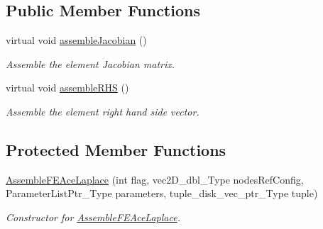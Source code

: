 \subsection*{Public Member Functions}
\begin{DoxyCompactItemize}
\item 
virtual void \hyperlink{classFEDD_1_1AssembleFEAceLaplace_ac47ac062ba522289f4e9a5dd2df78503}{assemble\+Jacobian} ()
\begin{DoxyCompactList}\small\item\em Assemble the element Jacobian matrix. \end{DoxyCompactList}\item 
virtual void \hyperlink{classFEDD_1_1AssembleFEAceLaplace_a6d2759738ff7b596b4f132bf234c772a}{assemble\+R\+HS} ()
\begin{DoxyCompactList}\small\item\em Assemble the element right hand side vector. \end{DoxyCompactList}\end{DoxyCompactItemize}
\subsection*{Protected Member Functions}
\begin{DoxyCompactItemize}
\item 
\hyperlink{classFEDD_1_1AssembleFEAceLaplace_a494e6229c1b403423c65810b0719e49e}{Assemble\+F\+E\+Ace\+Laplace} (int flag, vec2\+D\+\_\+dbl\+\_\+\+Type nodes\+Ref\+Config, Parameter\+List\+Ptr\+\_\+\+Type parameters, tuple\+\_\+disk\+\_\+vec\+\_\+ptr\+\_\+\+Type tuple)
\begin{DoxyCompactList}\small\item\em Constructor for \hyperlink{classFEDD_1_1AssembleFEAceLaplace}{Assemble\+F\+E\+Ace\+Laplace}. \end{DoxyCompactList}\end{DoxyCompactItemize}
